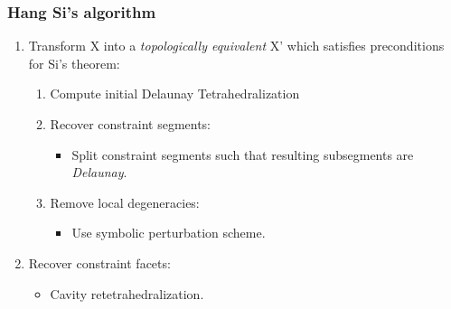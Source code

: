 \documentclass{beamer}
\begin{document}
	\begin{frame}
		\frametitle{Hang Si's algorithm} 
			\begin{enumerate}
				\item Transform X into a \textit{topologically equivalent} X' which satisfies preconditions for Si's theorem:	
				\begin{enumerate}
					\item Compute initial Delaunay Tetrahedralization	
					\item Recover constraint segments:
						\begin{itemize}
							\item Split constraint segments such that resulting subsegments are \textit{Delaunay}.	
						\end{itemize}	
					\item Remove local degeneracies:
						\begin{itemize}
							\item Use symbolic perturbation scheme.
						\end{itemize}		
				\end{enumerate}
				\item Recover constraint facets:
					\begin{itemize}
						\item Cavity retetrahedralization.	
					\end{itemize}		
			\end{enumerate}		
	\end{frame}
\end{document}
